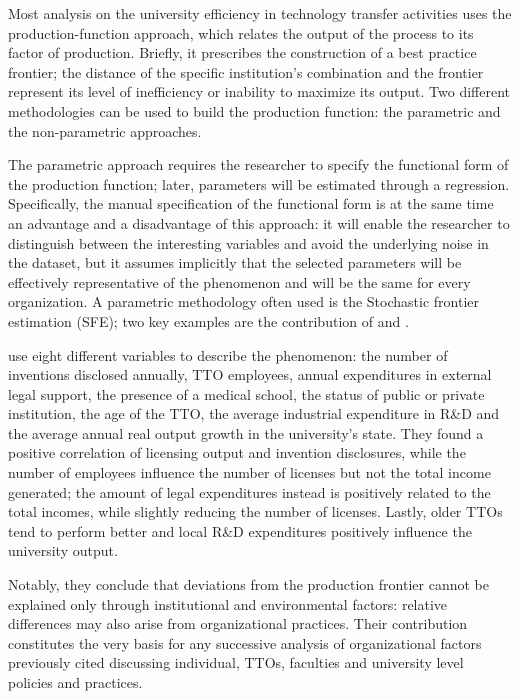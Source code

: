 Most analysis on the university efficiency in technology transfer activities uses the production-function approach, which relates the output of the process to its factor of production. Briefly, it prescribes the construction of a best practice frontier; the distance of the specific institution's combination and the frontier represent its level of inefficiency or inability to maximize its output. Two different methodologies can be used to build the production function: the parametric and the non-parametric approaches.

The parametric approach requires the researcher to specify the functional form of the production function; later, parameters will be estimated through a regression. Specifically, the manual specification of the functional form is at the same time an advantage and a disadvantage of this approach: it will enable the researcher to distinguish between the interesting variables and avoid the underlying noise in the dataset, but it assumes implicitly that the selected parameters will be effectively representative of the phenomenon and will be the same for every organization. A parametric methodology often used is the Stochastic frontier estimation (SFE); two key examples are the contribution of \citet{Siegel2003a} and \citet{Link2005}.

\citet{Siegel2003a} use eight different variables to describe the phenomenon: the number of inventions disclosed annually, TTO employees, annual expenditures in external legal support, the presence of a medical school, the status of public or private institution, the age of the TTO, the average industrial expenditure in R\&D and the average annual real output growth in the university's state. They found a positive correlation of licensing output and invention disclosures, while the number of employees influence the number of licenses but not the total income generated; the amount of legal expenditures instead is positively related to the total incomes, while slightly reducing the number of licenses. Lastly, older TTOs tend to perform better and local R\&D expenditures positively influence the university output. 

Notably, they conclude that deviations from the production frontier cannot be explained only through institutional and environmental factors: relative differences may also arise from organizational practices. Their contribution constitutes the very basis for any successive analysis of organizational factors previously cited discussing individual, TTOs, faculties and university level policies and practices. 

